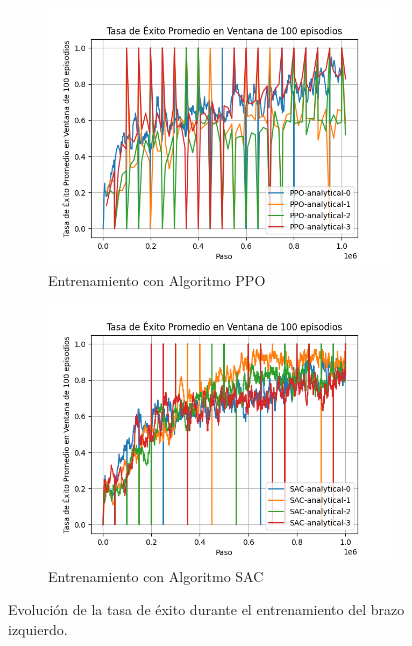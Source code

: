 \begin{figure}[h!]
	\centering
	
	\begin{subfigure}[b]{0.48\textwidth}
		\centering
		\includegraphics[width=\textwidth]{images/graphs/PPO/Left/success_rate}
		\caption{Entrenamiento con Algoritmo PPO}
		\label{fig:train-ppo-succ-left}
	\end{subfigure}
	\hfill
	\begin{subfigure}[b]{0.48\textwidth}
		\centering
		\includegraphics[width=\textwidth]{images/graphs/SAC/Left/success_rate}
		\caption{Entrenamiento con Algoritmo SAC}
		\label{fig:train-sac-succ-left}
	\end{subfigure}
	
	\caption{Evolución de la tasa de éxito durante el entrenamiento del brazo izquierdo.}
	\label{fig:train-succ-left}
\end{figure}

